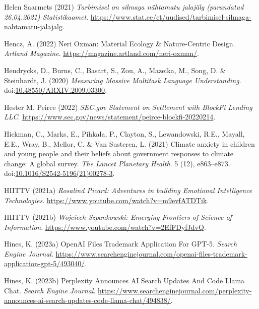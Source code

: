 \documentclass[
  letterpaper,
  DIV=11,
  numbers=noendperiod]{scrartcl}
\newlength{\cslhangindent}
\newenvironment{CSLReferences}[2] %
 {\begin{list}{}{%
  \setlength{\itemindent}{0pt}
  \setlength{\leftmargin}{0pt}
  \setlength{\parsep}{0pt}
  \ifodd #1
   \setlength{\leftmargin}{\cslhangindent}
   \setlength{\itemindent}{-1\cslhangindent}
  \fi
  \setlength{\itemsep}{#2\baselineskip}}}
 {\end{list}}
\begin{document}
\begin{CSLReferences}{0}{1}
Helen Saarmets (2021) \emph{{Tarbimisel on silmaga n{ä}htamatu
jalaj{ä}lg (parandatud 26.04.2021) {\textbar} Statistikaamet}}.
\url{https://www.stat.ee/et/uudised/tarbimisel-silmaga-nahtamatu-jalajalg}.

Hencz, A. (2022) Neri {Oxman}: {Material Ecology} \& {Nature-Centric
Design}. \emph{Artland Magazine}.
\url{https://magazine.artland.com/neri-oxman/}.

Hendrycks, D., Burns, C., Basart, S., Zou, A., Mazeika, M., Song, D. \&
Steinhardt, J. (2020) \emph{Measuring {Massive Multitask Language
Understanding}}.
doi:\href{https://doi.org/10.48550/ARXIV.2009.03300}{10.48550/ARXIV.2009.03300}.

Hester M. Peirce (2022) \emph{{SEC}.gov {\textbar} {Statement} on
{Settlement} with {BlockFi Lending LLC}}.
\url{https://www.sec.gov/news/statement/peirce-blockfi-20220214}.

Hickman, C., Marks, E., Pihkala, P., Clayton, S., Lewandowski, R.E.,
Mayall, E.E., Wray, B., Mellor, C. \& Van Susteren, L. (2021) Climate
anxiety in children and young people and their beliefs about government
responses to climate change: A global survey. \emph{The Lancet Planetary
Health}. 5 (12), e863--e873.
doi:\href{https://doi.org/10.1016/S2542-5196(21)00278-3}{10.1016/S2542-5196(21)00278-3}.

HIITTV (2021a) \emph{Rosalind {Picard}: {Adventures} in building
{Emotional Intelligence Technologies}}.
\url{https://www.youtube.com/watch?v=m9evfATDTik}.

HIITTV (2021b) \emph{Wojciech {Szpankowski}: {Emerging Frontiers} of
{Science} of {Information}}.
\url{https://www.youtube.com/watch?v=2EfFDyfJdvQ}.

Hines, K. (2023a) {OpenAI Files Trademark Application For GPT-5}.
\emph{Search Engine Journal}.
\url{https://www.searchenginejournal.com/openai-files-trademark-application-gpt-5/493040/}.

Hines, K. (2023b) Perplexity {Announces AI Search Updates And Code Llama
Chat}. \emph{Search Engine Journal}.
\url{https://www.searchenginejournal.com/perplexity-announces-ai-search-updates-code-llama-chat/494838/}.


\end{CSLReferences}
\end{document}
